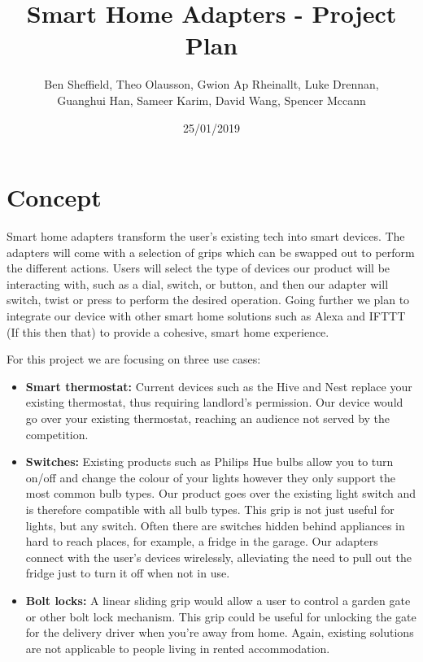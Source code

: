 \documentclass[onecolumn]{IEEEtran}
\begin{document}
\title{Smart Home Adapters - Project Plan}
\author{Ben Sheffield, Theo Olausson, Gwion Ap Rheinallt, Luke Drennan, \\Guanghui Han, Sameer Karim, David Wang, Spencer Mccann}
\date{25/01/2019} %

\maketitle

\tableofcontents

\section{Concept}
Smart home adapters transform the user’s existing tech into smart devices. The adapters will come with a selection of grips which can be swapped out to perform the different actions. Users will select the type of devices our product will be interacting with, such as a dial, switch, or button, and then our adapter will switch, twist or press to perform the desired operation. Going further we plan to integrate our device with other smart home solutions such as Alexa and IFTTT (If this then that) to provide a cohesive, smart home experience.

For this project we are focusing on three use cases:

\begin{itemize}
    \item \textbf{Smart thermostat:} Current devices such as the Hive and Nest replace your existing thermostat, thus requiring landlord’s permission. Our device would go over your existing thermostat, reaching an audience not served by the competition.
    \item \textbf{Switches:} Existing products such as Philips Hue bulbs allow you to turn on/off and change the colour of your lights however they only support the most common bulb types. Our product goes over the existing light switch and is therefore compatible with all bulb types. This grip is not just useful for lights, but any switch. Often there are switches hidden behind appliances in hard to reach places, for example, a fridge in the garage. Our adapters connect with the user’s devices wirelessly, alleviating the need to pull out the fridge just to turn it off when not in use.
    \item \textbf{Bolt locks:} A linear sliding grip would allow a user to control a garden gate or other bolt lock mechanism. This grip could be useful for unlocking the gate for the delivery driver when you’re away from home. Again, existing solutions are not applicable to people living in rented accommodation.
\end{itemize}
\end{document}
